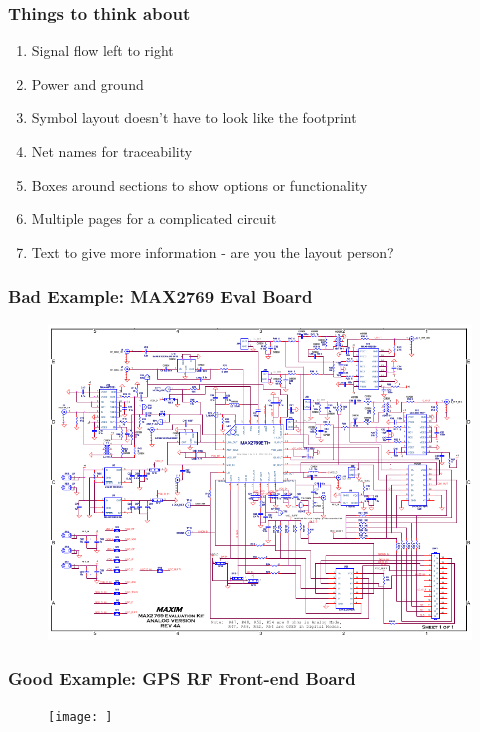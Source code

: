 \documentclass{beamer}
\begin{document}

\begin{frame}
\frametitle{Things to think about}
\begin{enumerate}
\item Signal flow left to right
\item Power and ground
\item Symbol layout doesn't have to look like the footprint
\item Net names for traceability
\item Boxes around sections to show options or functionality
\item Multiple pages for a complicated circuit
\item Text to give more information - are you the layout person?
\end{enumerate} 
\end{frame}


\begin{frame}
\frametitle{Bad Example: MAX2769 Eval Board}
\begin{figure}
\includegraphics[width=1\linewidth]{badschema.png}
\end{figure}
\end{frame}


\begin{frame}
\frametitle{Good Example: GPS RF Front-end Board}
\begin{figure}
\texttt{[image: ]}
\end{figure}
\end{frame}
\end{document}
